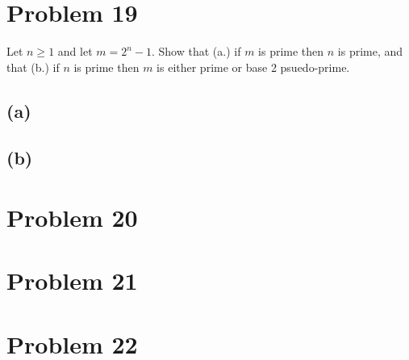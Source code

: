 \documentclass{article}
\theoremstyle{definition}
\begin{document}
\section*{Problem 19}
\begin{mdframed}
    Let $n \geqslant 1$ and let $m = 2^n - 1$. Show that (a.) if $m$ is prime then $n$ is prime, and that (b.) if $n$ is prime then $m$ is either prime or base 2 psuedo-prime.
\end{mdframed}
\subsection*{(a)}
\subsection*{(b)}
\section*{Problem 20}
\begin{mdframed}
    
\end{mdframed}
\section*{Problem 21}
\section*{Problem 22}
\end{document}
